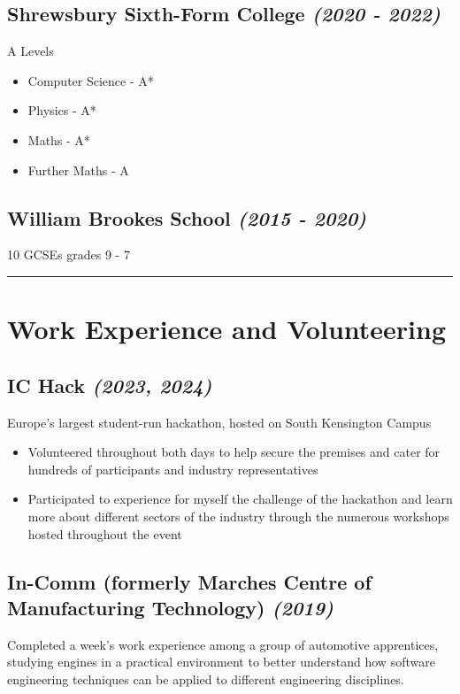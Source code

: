\documentclass{article}
\newcommand{\mrule} {\null\noindent\rule{\textwidth}{0.4pt}}
\newcommand{\mdates} {\hspace*{\fill}\textit}
\begin{document}
\subsection*{\textbf{Shrewsbury Sixth-Form College} \mdates{(2020 - 2022)}}

A Levels

\begin{itemize}[noitemsep]
    \item Computer Science - A*
    \item Physics - A*
    \item Maths - A*
    \item Further Maths - A
\end{itemize}

\subsection*{\textbf{William Brookes School} \mdates{(2015 - 2020)}}

10 GCSEs grades 9 - 7

\mrule


\section*{Work Experience and Volunteering}

\subsection*{\textbf{IC Hack} \mdates{(2023, 2024)}}
Europe's largest student-run hackathon, hosted on South Kensington Campus

\begin{itemize}[noitemsep]
    \item Volunteered throughout both days to help secure the premises and cater for hundreds of participants and industry representatives
    \item Participated to experience for myself the challenge of the hackathon and learn more about different 
        sectors of the industry through the numerous workshops hosted throughout the event
\end{itemize}


\subsection*{\textbf{In-Comm} (formerly Marches Centre of Manufacturing Technology) \mdates{(2019)}}

Completed a week's work experience among a group of automotive apprentices, studying engines in a practical environment to 
    better understand how software engineering techniques can be applied to different engineering disciplines.
\end{document}
